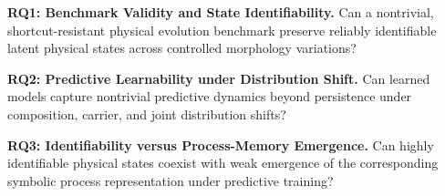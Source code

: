 
\textbf{RQ1: Benchmark Validity and State Identifiability.}
Can a nontrivial, shortcut-resistant physical evolution benchmark
preserve reliably identifiable latent physical states across controlled
morphology variations?

\textbf{RQ2: Predictive Learnability under Distribution Shift.}
Can learned models capture nontrivial predictive dynamics beyond
persistence under composition, carrier, and joint distribution shifts?

\textbf{RQ3: Identifiability versus Process-Memory Emergence.}
Can highly identifiable physical states coexist with weak emergence
of the corresponding symbolic process representation under predictive
training?
